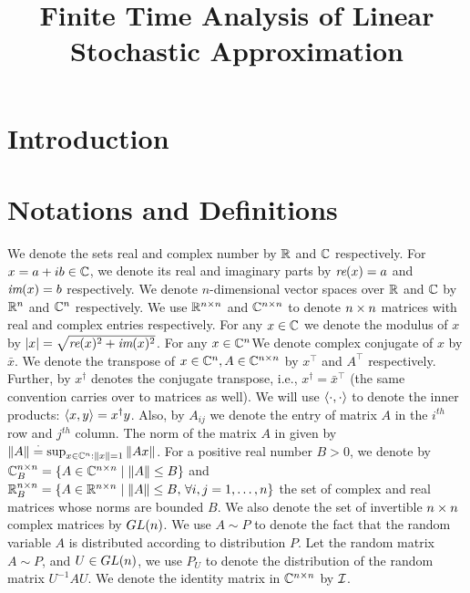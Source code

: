 \documentclass{article}
\title{Finite Time Analysis of Linear Stochastic Approximation}
\author{
}
\begin{document}

\maketitle
\begin{abstract}

\end{abstract}

\section{Introduction}


\section{Notations and Definitions}

We denote the sets real and complex number by $\mathbb{R}$ and $\mathbb{C}$ respectively. For $x=a+ib\in \mathbb{C}$, we denote its real and imaginary parts by $\emph{re}(x)=a$ and $\emph{im}(x)=b$ respectively. We denote $n$-dimensional vector spaces over $\mathbb{R}$ and $\mathbb{C}$ by $\mathbb{R}^{n}$ and $\mathbb{C}^{n}$ respectively. We use $\mathbb{R}^{n\times n}$ and $\mathbb{C}^{n\times n}$ to denote $n\times n$ matrices with real and complex entries respectively. For any $x\in \mathbb{C}$ we denote the modulus of $x$ by $\left|x\right|=\sqrt{\emph{re}(x)^2+\emph{im}(x)^2}$. For any $x\in \mathbb{C}^n$We denote complex conjugate of $x$ by $\bar{x}$. We denote the transpose of $x\in \mathbb{C}^{n}, A\in \mathbb{C}^{n\times n}$ by $x^\top$ and $A^\top$ respectively. Further, by $x^\dag$ denotes the conjugate transpose, i.e., $x^\dag=\bar{x}^\top$ (the same convention carries over to matrices as well). We will use $\langle\cdot,\cdot\rangle$ to denote the inner products: $\langle x,y\rangle=x^\dag y$. Also, by $A_{ij}$ we denote the entry of matrix $A$ in the $i^{th}$ row and $j^{th}$ column.
The norm of the matrix $A$ in given by $\left\| A\right\|\stackrel{\cdot}{=} \sup_{x\in \mathbb{C}^n:\left\| x\right\|=1} \left\| Ax\right\|$. For a positive real number $B>0$, we denote by $\mathbb{C}^{n\times n}_B=\{A\in \mathbb{C}^{n\times n}\mid \left\| A\right\|\leq B\}$ and  $\mathbb{R}^{n\times n}_B=\{A\in \mathbb{R}^{n\times n}\mid \left\| A\right\|\leq B,\,\forall i,j=1,\ldots,n\}$ the set of complex and real matrices whose norms are bounded $B$.
We also denote the set of invertible $n\times n$ complex matrices by $GL(n)$. We use $A\sim P$ to denote the fact that the random variable $A$ is distributed according to distribution $P$. Let the random matrix $A\sim P$, and $U\in GL(n)$, we use $P_U$ to denote the distribution of the random matrix $U^{-1}A U$.  We denote the identity matrix in $\mathbb{C}^{n\times n}$ by $\mathcal{I}$.
\end{document}
